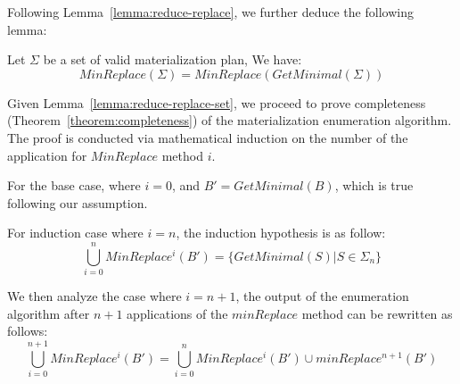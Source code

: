 


Following Lemma~\ref{lemma:reduce-replace}, we further deduce the following lemma:
\begin{lemma}\label{lemma:reduce-replace-set}
    Let $\Sigma$ be a set of valid materialization plan, 
    We have:
    \[ MinReplace(\Sigma) = MinReplace(GetMinimal(\Sigma)) \]
\end{lemma}

Given Lemma~\ref{lemma:reduce-replace-set}, we proceed to prove completeness 
(Theorem~\ref{theorem:completeness})
of the materialization enumeration algorithm.
The proof is conducted via mathematical induction on the number 
of the application for $MinReplace$ method $i$.

For the base case, where $i = 0$, and $B' = GetMinimal(B)$,
which is true following our assumption.

For induction case where $i=n$, the induction hypothesis is as follow:
\[ \bigcup_{i=0}^{n}MinReplace^i(B') =  \{ GetMinimal(S)  | S \in \Sigma_n \} \]

We then analyze the case where $i=n+1$, the output of the enumeration algorithm
after $n+1$ applications of the $minReplace$ method can be rewritten as follows:
\[
    \bigcup_{i=0}^{n+1}MinReplace^i(B') = \bigcup_{i=0}^{n}MinReplace^i(B') \cup minReplace^{n+1}(B')
\]

